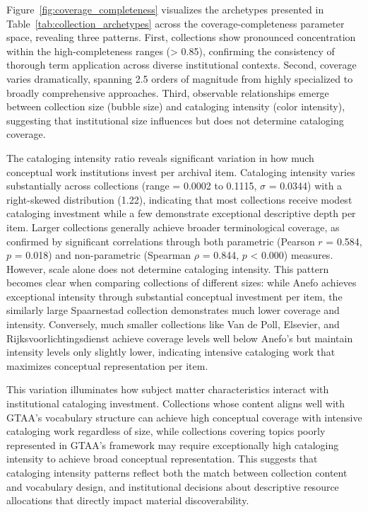 \documentclass[final]{anthology-ch}
\begin{document}
Figure~\ref{fig:coverage_completeness} visualizes the archetypes presented in Table~\ref{tab:collection_archetypes} across the coverage-completeness parameter space, revealing three patterns. First, collections show pronounced concentration within the high-completeness ranges (> 0.85), confirming the consistency of thorough term application across diverse institutional contexts. Second, coverage varies dramatically, spanning 2.5 orders of magnitude from highly specialized to broadly comprehensive approaches. Third, observable relationships emerge between collection size (bubble size) and cataloging intensity (color intensity), suggesting that institutional size influences but does not determine cataloging coverage. 

The cataloging intensity ratio reveals significant variation in how much conceptual work institutions invest per archival item. Cataloging intensity varies substantially across collections (range = 0.0002 to 0.1115, $\sigma$ = 0.0344) with a right-skewed distribution (1.22), indicating that most collections receive modest cataloging investment while a few demonstrate exceptional descriptive depth per item.
Larger collections generally achieve broader terminological coverage, as confirmed by significant correlations through both parametric (Pearson $r$ = 0.584, $p$ = 0.018) and non-parametric (Spearman $\rho$ = 0.844, $p$ < 0.000) measures. However, scale alone does not determine cataloging intensity. This pattern becomes clear when comparing collections of different sizes: while Anefo achieves exceptional intensity through substantial conceptual investment per item, the similarly large Spaarnestad collection demonstrates much lower coverage and intensity. Conversely, much smaller collections like Van de Poll, Elsevier, and Rijksvoorlichtingsdienst achieve coverage levels well below Anefo's but maintain intensity levels only slightly lower, indicating intensive cataloging work that maximizes conceptual representation per item.

This variation illuminates how subject matter characteristics interact with institutional cataloging investment. Collections whose content aligns well with GTAA's vocabulary structure can achieve high conceptual coverage with intensive cataloging work regardless of size, while collections covering topics poorly represented in GTAA's framework may require exceptionally high cataloging intensity to achieve broad conceptual representation. This suggests that cataloging intensity patterns reflect both the match between collection content and vocabulary design, and institutional decisions about descriptive resource allocations that directly impact material discoverability.
\end{document}
